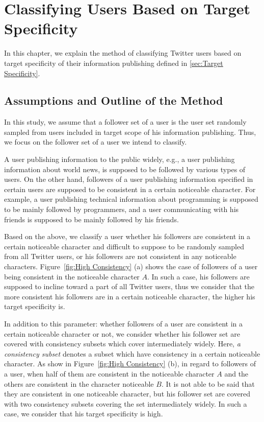 \section{Classifying Users Based on Target Specificity}
\label{sec:ClassificationMethod1}

In this chapter, we explain the method of classifying Twitter users
based on target specificity of their information publishing defined
in \ref{sec:Target Specificity}.

\subsection{Assumptions and Outline of the Method}
\label{subsec:Assumptions}

In this study, we assume that a follower set of a user is the
user set randomly sampled from users included in target scope of his
information publishing.  Thus, we focus on the follower set of a user we
intend to classify.

A user publishing information to the public widely, e.g., a user
publishing information about world news, is supposed to be followed
by various types of users.  On the other hand, followers of a user
publishing information specified in certain users are supposed to be
consistent in a certain noticeable character.  For example, a user
publishing technical information about programming is supposed to be
mainly followed by programmers, and a user communicating with his
friends is supposed to be mainly followed by his friends.

Based on the above, we classify a user whether his followers are consistent
in a certain noticeable character and difficult to suppose to be
randomly sampled from all Twitter users, or his followers are not
consistent in any noticeable characters.  Figure~\ref{fig:High
Consistency} (a) shows the case of followers of a user being consistent
in the noticeable character $A$.  In such a case, his followers are
supposed to incline toward a part of all Twitter users, thus we consider
that the more consistent his followers are in a certain noticeable
character, the higher his target specificity is.

In addition to this parameter: whether followers of a user are
consistent in a certain noticeable character or not, we consider
whether his follower set are covered with consistency subsets which
cover intermediately widely.  Here, \emph{a consistency subset} denotes
a subset which have consistency in a certain noticeable character.  As
show in Figure~\ref{fig:High Consistency} (b), in regard to followers of
a user, when half of them are consistent in the noticeable character $A$
and the others are consistent in the character noticeable $B$.  It is
not able to
be said that they are consistent in one noticeable character, but
his follower set are covered with two consistency subsets covering the
set intermediately widely.  In such a case, we consider that his
target specificity is high.

